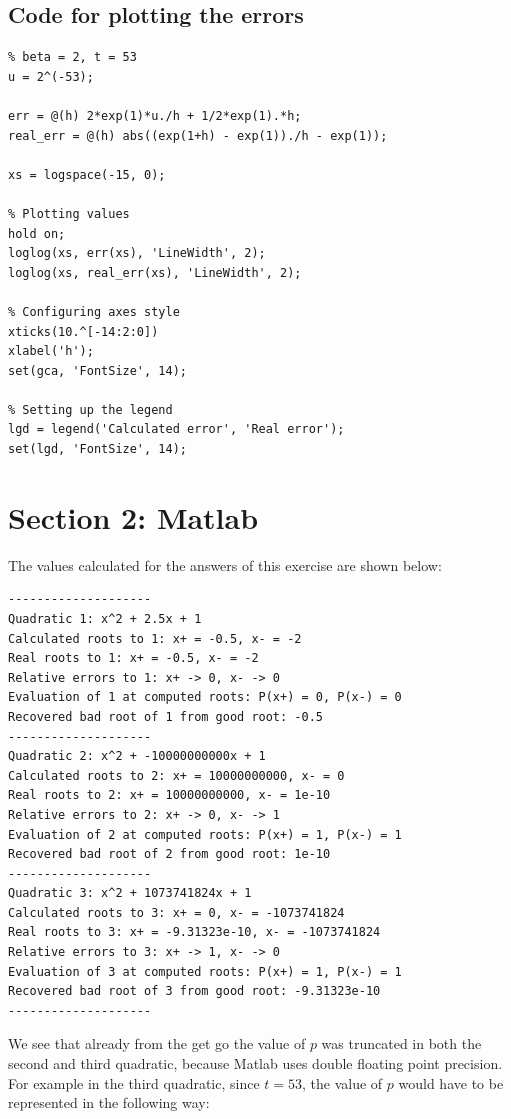 \documentclass{article}
\begin{document}
\subsection*{Code for plotting the errors}

\begin{verbatim}
% beta = 2, t = 53
u = 2^(-53);

err = @(h) 2*exp(1)*u./h + 1/2*exp(1).*h;
real_err = @(h) abs((exp(1+h) - exp(1))./h - exp(1));

xs = logspace(-15, 0);

% Plotting values
hold on;
loglog(xs, err(xs), 'LineWidth', 2);
loglog(xs, real_err(xs), 'LineWidth', 2);

% Configuring axes style
xticks(10.^[-14:2:0])
xlabel('h');
set(gca, 'FontSize', 14);

% Setting up the legend
lgd = legend('Calculated error', 'Real error');
set(lgd, 'FontSize', 14);
\end{verbatim}

\section*{Section 2: Matlab}

The values calculated for the answers of this exercise are shown below:

\begin{verbatim}
--------------------
Quadratic 1: x^2 + 2.5x + 1
Calculated roots to 1: x+ = -0.5, x- = -2
Real roots to 1: x+ = -0.5, x- = -2
Relative errors to 1: x+ -> 0, x- -> 0
Evaluation of 1 at computed roots: P(x+) = 0, P(x-) = 0
Recovered bad root of 1 from good root: -0.5
--------------------
Quadratic 2: x^2 + -10000000000x + 1
Calculated roots to 2: x+ = 10000000000, x- = 0
Real roots to 2: x+ = 10000000000, x- = 1e-10
Relative errors to 2: x+ -> 0, x- -> 1
Evaluation of 2 at computed roots: P(x+) = 1, P(x-) = 1
Recovered bad root of 2 from good root: 1e-10
--------------------
Quadratic 3: x^2 + 1073741824x + 1
Calculated roots to 3: x+ = 0, x- = -1073741824
Real roots to 3: x+ = -9.31323e-10, x- = -1073741824
Relative errors to 3: x+ -> 1, x- -> 0
Evaluation of 3 at computed roots: P(x+) = 1, P(x-) = 1
Recovered bad root of 3 from good root: -9.31323e-10
--------------------
\end{verbatim}

We see that already from the get go the value of $p$ was truncated
in both the second and third quadratic, because Matlab uses double
floating point precision. For example in the third quadratic,
since $t = 53$, the
value of $p$ would have to be represented in the following way:
\end{document}
